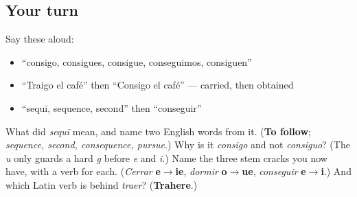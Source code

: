 \subsection*{Your turn}
Say these aloud:

\begin{itemize}
\raggedright
  \item \textquotedblleft{}consigo, consigues, consigue, conseguimos, consiguen\textquotedblright{}
  \item \textquotedblleft{}Traigo el café\textquotedblright{} then \textquotedblleft{}Consigo el café\textquotedblright{} — carried, then obtained
  \item \textquotedblleft{}sequī, sequence, second\textquotedblright{} then \textquotedblleft{}conseguir\textquotedblright{}
\end{itemize}

\begin{tcolorbox}[breakable,colback=teal!4,colframe=teal!35!black,title={Before you move on}]
What did \emph{sequī} mean, and name two English words from it. (\textbf{To follow}; \emph{sequence, second, consequence, pursue}.) Why is it \emph{consigo} and not \emph{consiguo}? (The \emph{u} only guards a hard \emph{g} before \emph{e} and \emph{i}.) Name the three stem cracks you now have, with a verb for each. (\emph{Cerrar} \textbf{e$\to$ie}, \emph{dormir} \textbf{o$\to$ue}, \emph{conseguir} \textbf{e$\to$i}.) And which Latin verb is behind \emph{traer}? (\textbf{Trahere}.)
\end{tcolorbox}
